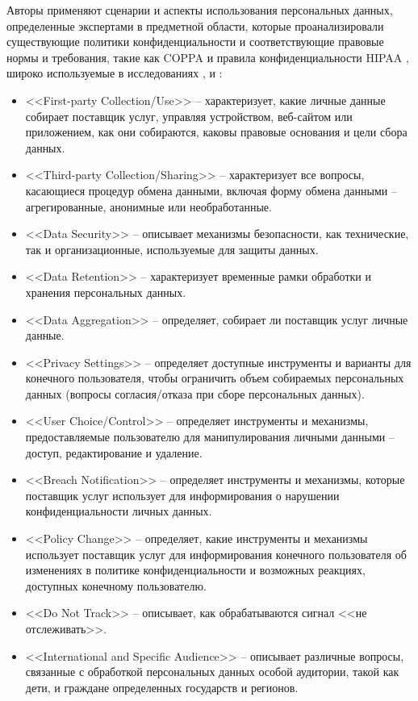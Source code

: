 \documentclass[../main]{subfiles}
\begin{document}
Авторы \cite{P2Onto} применяют сценарии и аспекты использования персональных данных, определенные экспертами в предметной области, которые проанализировали существующие политики конфиденциальности и соответствующие правовые нормы и требования, такие как COPPA \cite{MDPI2} и правила конфиденциальности HIPAA \cite{MDPI3}, широко используемые в исследованиях \cite{MDPI6}, \cite{MDPI8} и \cite{MDPI18}:
\begin{itemize}
    \item <<First-party Collection/Use>> -- характеризует, какие личные данные собирает поставщик услуг, управляя устройством, веб-сайтом или приложением, как они собираются, каковы правовые основания и цели сбора данных.
    \item <<Third-party Collection/Sharing>> -- характеризует все вопросы, касающиеся процедур обмена данными, включая форму обмена данными -- агрегированные, анонимные или необработанные.
    \item <<Data Security>> -- описывает механизмы безопасности, как технические, так и организационные, используемые для защиты данных.
    \item <<Data Retention>> -- характеризует временные рамки обработки и хранения персональных данных.
    \item <<Data Aggregation>> -- определяет, собирает ли поставщик услуг личные данные.
    \item <<Privacy Settings>> -- определяет доступные инструменты и варианты для конечного пользователя, чтобы ограничить объем собираемых персональных данных (вопросы согласия/отказа при сборе персональных данных).
    \item <<User Choice/Control>> -- определяет инструменты и механизмы, предоставляемые пользователю для манипулирования личными данными -- доступ, редактирование и удаление.
    \item <<Breach Notification>> -- определяет инструменты и механизмы, которые поставщик услуг использует для информирования о нарушении конфиденциальности личных данных.
    \item <<Policy Change>> -- определяет, какие инструменты и механизмы использует поставщик услуг для информирования конечного пользователя об изменениях в политике конфиденциальности и возможных реакциях, доступных конечному пользователю.
    \item <<Do Not Track>> -- описывает, как обрабатываются сигнал <<не отслеживать>>.
    \item <<International and Specific Audience>> -- описывает различные вопросы, связанные с обработкой персональных данных особой аудитории, такой как дети, и граждане определенных государств и регионов.
\end{itemize}
\end{document}
